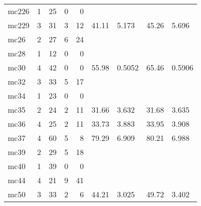 \documentclass{article}
\begin{document}
\begin{longtable}{lrrrrllll}
 mc226 &  1 &  25 &        0 &          0 &        &            &        &           \\
 mc229 &  3 &  31 &        3 &         12 &  41.11 &      5.173 &  45.26 &     5.696 \\
  mc26 &  2 &  27 &        6 &         24 &        &            &        &           \\
  mc28 &  1 &  12 &        0 &          0 &        &            &        &           \\
  mc30 &  4 &  42 &        0 &          0 &  55.98 &     0.5052 &  65.46 &    0.5906 \\
  mc32 &  3 &  33 &        5 &         17 &        &            &        &           \\
  mc34 &  1 &  23 &        0 &          0 &        &            &        &           \\
  mc35 &  2 &  24 &        2 &         11 &  31.66 &      3.632 &  31.68 &     3.635 \\
  mc36 &  4 &  25 &        2 &         11 &  33.73 &      3.883 &  33.95 &     3.908 \\
  mc37 &  4 &  60 &        5 &          8 &  79.29 &      6.909 &  80.21 &     6.988 \\
  mc39 &  2 &  29 &        5 &         18 &        &            &        &           \\
  mc40 &  1 &  39 &        0 &          0 &        &            &        &           \\
  mc44 &  4 &  21 &        9 &         41 &        &            &        &           \\
  mc50 &  3 &  33 &        2 &          6 &  44.21 &      3.025 &  49.72 &     3.402 \\
\end{longtable}
\end{document}
